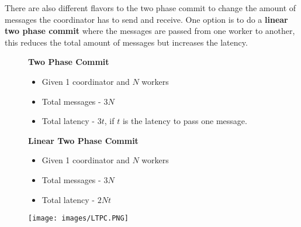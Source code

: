 There are also different flavors to the two phase commit to change the amount of messages the coordinator has to send and receive. One option is to do a \textbf{linear two phase commit} where the messages are passed from one worker to another, this reduces the total amount of messages but increases the latency.
\begin{figure}[H]
\begin{minipage}[t]{.5\textwidth}
\textbf{Two Phase Commit}
\begin{itemize}
\item Given 1 coordinator and $N$ workers
\item Total messages - $3N$
\item Total latency - $3t$, if $t$ is the latency to pass one message.
\end{itemize}
\textbf{Linear Two Phase Commit}
\begin{itemize}
\item Given 1 coordinator and $N$ workers
\item Total messages - $3N$
\item Total latency - $2Nt$
\end{itemize}
\end{minipage}
\begin{minipage}[t]{.5\textwidth}
\strut\vspace*{-\baselineskip}\newline
\texttt{[image: images/LTPC.PNG]}
\label{LTPC}
\end{minipage}
\end{figure}

